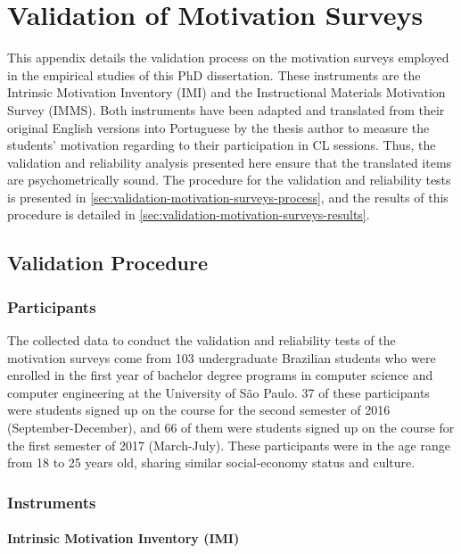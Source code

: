 \chapter{Validation of Motivation Surveys}
\label{appendix:validation-motivation-surveys}

This appendix details the validation process on the motivation surveys employed in the empirical studies of this PhD dissertation. These instruments are the Intrinsic Motivation Inventory (IMI) and the Instructional Materials Motivation Survey (IMMS). Both instruments have been adapted and translated from their original English versions into Portuguese by the thesis author to measure the students' motivation regarding to their participation in CL sessions. Thus, the validation and reliability analysis presented here ensure that the translated items are psychometrically sound. The procedure for the validation and reliability tests is presented in \autoref{sec:validation-motivation-surveys-process}, and the results of this procedure is detailed in \autoref{sec:validation-motivation-surveys-results}.

\section{Validation Procedure}
\label{sec:validation-motivation-surveys-process}

\subsection{Participants}

The collected data to conduct the validation and reliability tests of the motivation surveys come from 103 undergraduate Brazilian students who were enrolled in the first year of bachelor degree programs in computer science and computer engineering at the University of São Paulo. 37 of these participants were students signed up on the course  for the second semester of 2016 (September-December), and 66 of them were students signed up on the course for the first semester of 2017 (March-July). These participants were in the age range from 18 to 25 years old, sharing similar social-economy status and culture.

\subsection{Instruments}

\subsubsection*{Intrinsic Motivation Inventory (IMI)}

